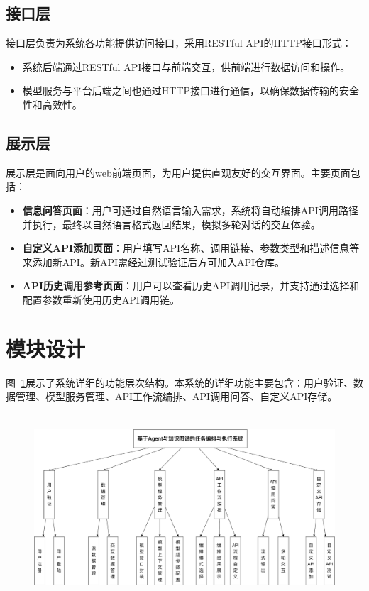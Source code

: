 \subsection{接口层}

接口层负责为系统各功能提供访问接口，采用RESTful API的HTTP接口形式：
\begin{itemize}
    \item 系统后端通过RESTful API接口与前端交互，供前端进行数据访问和操作。
    \item 模型服务与平台后端之间也通过HTTP接口进行通信，以确保数据传输的安全性和高效性。
\end{itemize}

\subsection{展示层}

展示层是面向用户的web前端页面，为用户提供直观友好的交互界面。主要页面包括：
\begin{itemize}
    \item \textbf{信息问答页面}：用户可通过自然语言输入需求，系统将自动编排API调用路径并执行，最终以自然语言格式返回结果，模拟多轮对话的交互体验。
    \item \textbf{自定义API添加页面}：用户填写API名称、调用链接、参数类型和描述信息等来添加新API。新API需经过测试验证后方可加入API仓库。
    \item \textbf{API历史调用参考页面}：用户可以查看历史API调用记录，并支持通过选择和配置参数重新使用历史API调用链。
\end{itemize}

\section{模块设计}

图~\ref{fig:module}展示了系统详细的功能层次结构。本系统的详细功能主要包含：用户验证、数据管理、模型服务管理、API工作流编排、API调用问答、自定义API存储。

\begin{figure}[!htp]
  \vspace{1em}
  \centering
  \setlength{\abovecaptionskip}{10pt} %
  \includegraphics[height=7cm]{../assets/ch5-系统模块图.pdf}
  \label{fig:module}
\end{figure}

